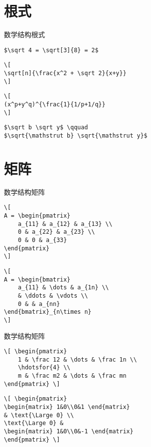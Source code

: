 \documentclass[11pt]{beamer}
\begin{document}
\section{根式}

\begin{frame}[fragile]{数学结构}{根式}
\begin{lstlisting}
$\sqrt 4 = \sqrt[3]{8} = 2$
\end{lstlisting}
\begin{lstlisting}
\[
\sqrt[n]{\frac{x^2 + \sqrt 2}{x+y}}
\]
\end{lstlisting}
\begin{lstlisting}
\[
(x^p+y^q)^{\frac{1}{1/p+1/q}}
\]
\end{lstlisting}
\begin{lstlisting}
$\sqrt b \sqrt y$ \qquad
$\sqrt{\mathstrut b} \sqrt{\mathstrut y}$
\end{lstlisting}
\end{frame}

\section{矩阵}

\begin{frame}[fragile]{数学结构}{矩阵}
\begin{lstlisting}
\[
A = \begin{pmatrix}
	a_{11} & a_{12} & a_{13} \\
	0 & a_{22} & a_{23} \\
	0 & 0 & a_{33}
\end{pmatrix}
\]
\end{lstlisting}
\begin{lstlisting}
\[
A = \begin{bmatrix}
	a_{11} & \dots & a_{1n} \\
	& \ddots & \vdots \\
	0 & & a_{nn}
\end{bmatrix}_{n\times n}
\]
\end{lstlisting}
\end{frame}

\begin{frame}[fragile]{数学结构}{矩阵}
\begin{lstlisting}
\[ \begin{pmatrix}
	1 & \frac 12 & \dots & \frac 1n \\
	\hdotsfor{4} \\
	m & \frac m2 & \dots & \frac mn
\end{pmatrix} \]
\end{lstlisting}
\begin{lstlisting}
\[ \begin{pmatrix}
\begin{matrix} 1&0\\0&1 \end{matrix}
& \text{\Large 0} \\
\text{\Large 0} &
\begin{matrix} 1&0\\0&-1 \end{matrix}
\end{pmatrix} \]
\end{lstlisting}
\end{frame}
\end{document}
